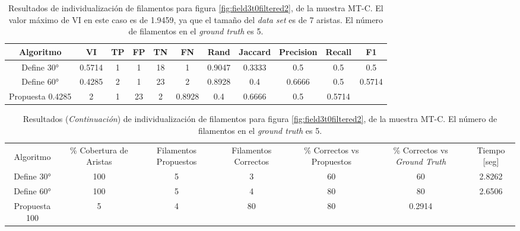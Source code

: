 \begin{table}[h]
    \centering
    \begin{tabular}{|c|c|c|c|c|c|c|c|c|c|c|}
    \hline
        Algoritmo & VI & TP & FP &TN &FN & Rand	& Jaccard &	Precision &	Recall &	F1 \\ \hline
        Define 30° & 0.5714 & 1 & 1 & 18 & 1 & 0.9047 & 0.3333 & 0.5      & 0.5 & 0.5\\
        Define 60° & 0.4285 & 2 & 1 & 23 & 2 & 0.8928 & 0.4 & 0.6666 & 0.5 & 0.5714\\ 
        Propuesta 0.4285  & 2 & 1 & 23 & 2 & 0.8928 & 0.4 & 0.6666 & 0.5 & 0.5714\\
        \hline
    \end{tabular}
    \caption{Resultados de individualizaci\'on de filamentos para figura \ref{fig:field3t0filtered2}, de la muestra MT-C. El valor m\'aximo de VI en este caso es de 1.9459, ya que el tama\~no del {\it data set} es de 7 aristas. El n\'umero de filamentos en el {\it ground truth} es 5.}
    \label{tab:field3t0filtered2}
\end{table}
\addtocounter{table}{-1}
\begin{table}[h]
    \centering
    \begin{tabular}{|c|c|c|c|c|c|c|}
    \hline
         & \multirow{4}{2cm}{\centering \% Cobertura de Aristas} & \multirow{4}{2cm}{Filamentos Propuestos} & \multirow{4}{2cm}{Filamentos Correctos} & \multirow{4}{2.5cm}{\% Correctos vs Propuestos} & \multirow{4}{2.5cm}{\centering \% Correctos vs {\it Ground Truth}} & \multirow{4}{1.2cm}{\centering Tiempo [seg]} \\
         &  &  &  & & &  \\
        Algoritmo &  &  &  & & &  \\
        &  &  &  & & &  \\ \hline
        Define 30° & 100 & 5 & 3 & 60 & 60 & 2.8262\\
        Define 60° & 100 & 5 & 4 & 80 & 80 & 2.6506\\ 
        Propuesta 100 & 5 & 4 & 80 & 80 & 0.2914\\
        \hline
    \end{tabular}
    \caption{Resultados ({\it Continuaci\'on}) de individualizaci\'on de filamentos para figura \ref{fig:field3t0filtered2}, de la muestra MT-C. El n\'umero de filamentos en el {\it ground truth} es 5.}
\end{table}


